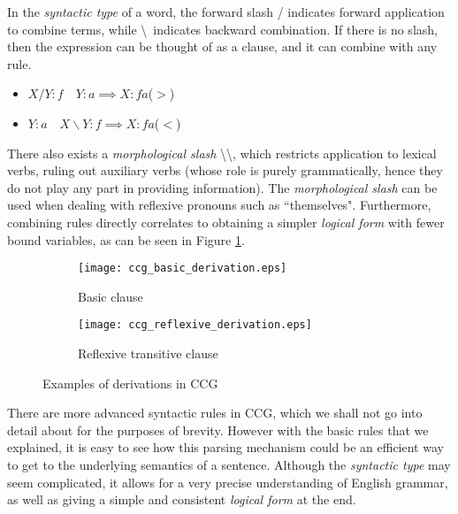 \noindent
In the \textit{syntactic type} of a word, the forward slash / indicates forward application to combine terms, while \textbackslash \ indicates backward combination. If there is no slash, then the expression can be thought of as a clause, and it can combine with any rule.

\begin{itemize}[nolistsep]
\item $X/Y:f \quad Y:a \implies X:fa$\quad($>$)
\item $Y:a \quad X\backslash Y:f \implies X:fa$\quad($<$)
\end{itemize}

\mbox{}

\noindent
There also exists a \textit{morphological slash} \textbackslash\textbackslash, which restricts application to lexical verbs, ruling out auxiliary verbs (whose role is purely grammatically, hence they do not play any part in providing information). The \textit{morphological slash} can be used when dealing with reflexive pronouns such as ``themselves". Furthermore, combining rules directly correlates to obtaining a simpler \textit{logical form} with fewer bound variables, as can be seen in Figure \ref{fig:ccg_derivations}.

\begin{figure}[H]
\centering
\begin{subfigure}{0.3\textwidth}
\centering
\texttt{[image: ccg\_basic\_derivation.eps]}
\caption{\cite{steedman_combinatory_nodate} Basic clause}
\end{subfigure}
\begin{subfigure}{0.6\textwidth}
\centering
\texttt{[image: ccg\_reflexive\_derivation.eps]}
\caption{\cite{steedman_combinatory_nodate} Reflexive transitive clause}
\end{subfigure}
\caption{Examples of derivations in CCG}
\label{fig:ccg_derivations}
\end{figure}

\noindent
There are more advanced syntactic rules in CCG, which we shall not go into detail about for the purposes of brevity. However with the basic rules that we explained, it is easy to see how this parsing mechanism could be an efficient way to get to the underlying semantics of a sentence. Although the \textit{syntactic type} may seem complicated, it allows for a very precise understanding of English grammar, as well as giving a simple and consistent \textit{logical form} at the end.


